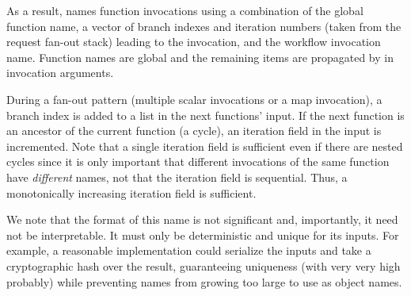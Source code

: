 As a result, \name{} names function invocations using a combination of the
global function name, a vector of branch indexes and iteration numbers (taken
from the \name{} request fan-out stack) leading to the invocation, and the
workflow invocation name. Function names are global and the remaining items are
propagated by \name{} in invocation arguments.

During a fan-out pattern (multiple scalar invocations or a map invocation), a
branch index is added to a list in the next functions' input. If the next
function is an ancestor of the current function (a cycle), an iteration field in
the input is incremented. Note that a single iteration field is sufficient even
if there are nested cycles since it is only important that different invocations
of the same function have \emph{different} names, not that the iteration field
is sequential. Thus, a monotonically increasing iteration field is sufficient.

We note that the format of this name is not significant and, importantly, it
need not be interpretable. It must only be deterministic and unique for its
inputs. For example, a reasonable implementation could serialize the inputs and
take a cryptographic hash over the result, guaranteeing uniqueness (with very
very high probably) while preventing names from growing too large to use as
object names.
